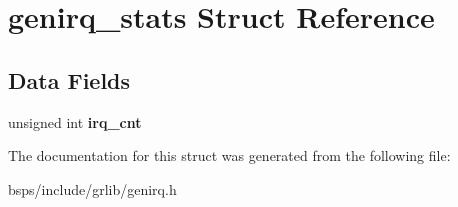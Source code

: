 \hypertarget{structgenirq__stats}{}\section{genirq\+\_\+stats Struct Reference}
\label{structgenirq__stats}
\subsection*{Data Fields}
\begin{DoxyCompactItemize}
\item 
\mbox{\label{structgenirq__stats_a2eefe345f30840bbca285c1b58ba851c}} 
unsigned int {\bfseries irq\+\_\+cnt}
\end{DoxyCompactItemize}


The documentation for this struct was generated from the following file\+:\begin{DoxyCompactItemize}
\item 
bsps/include/grlib/genirq.\+h\end{DoxyCompactItemize}
